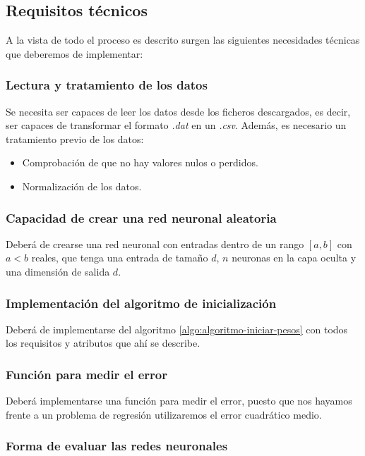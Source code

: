 \subsection{Requisitos técnicos}  

A la vista de todo el proceso es descrito surgen las siguientes necesidades técnicas que deberemos de implementar:  

\subsubsection{Lectura y tratamiento de los datos}

Se necesita ser capaces de leer los datos desde los ficheros descargados, es decir, ser capaces de transformar el formato \textit{.dat} en un \textit{.csv}. 
Además, es necesario un tratamiento previo de los datos: 
\begin{itemize}
    \item Comprobación de que no hay valores nulos o perdidos. 
    \item Normalización de los datos. 
\end{itemize}


\subsubsection{Capacidad de crear una red neuronal aleatoria}  

Deberá de crearse una red neuronal con entradas dentro de un rango $[a,b]$ con $a < b$ reales,
que tenga una entrada de tamaño $d$,
$n$ neuronas en la capa oculta y
una dimensión de salida $d$.

\subsubsection{Implementación del algoritmo de inicialización}

Deberá de implementarse del algoritmo  \ref{algo:algoritmo-iniciar-pesos} con todos los requisitos y atributos que ahí se describe.  

\subsubsection{Función para medir el error}

Deberá implementarse una función para medir el
 error, puesto que nos hayamos frente a un problema de regresión utilizaremos el error cuadrático medio. 

\subsubsection{Forma de evaluar las redes neuronales}  

